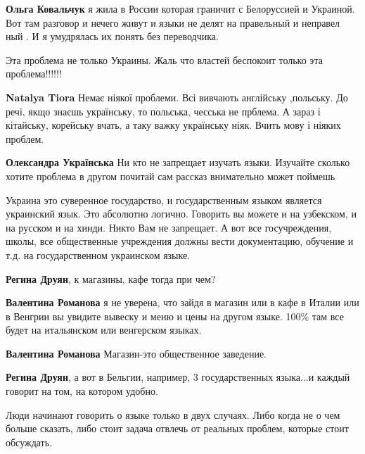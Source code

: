 \begin{itemize}
{\begin{itemize}

\textbf{Ольга Ковальчук} я жила в России которая граничит с Белоруссией и Украиной. Вот
там разговор и нечего живут и языки не делят на правельный и неправел ный . И я
умудрялась их понять без переводчика.

\end{itemize}


Эта проблема не только Украины. Жаль что властей беспокоит только эта проблема!!!!!!

\begin{itemize}
\textbf{Natalya Tiora} Немає ніякої проблеми. Всі вивчають англійську
,польську. До речі, якщо знаєшь українську, то польська, чесська не прблема. А
зараз і кітайську, корейську вчать, а таку важку українську ніяк. Вчить мову і
ніяких проблем.

\textbf{Олександра Українська} 
Ни кто не запрещает изучать языки. Изучайте сколько хотите
проблема в другом почитай сам рассказ внимательно может поймешь
\end{itemize}


Украина это суверенное государство, и государственным языком является
украинский язык. Это абсолютно логично. Говорить вы можете и на узбекском, и на
русском и на хинди. Никто Вам не запрещает. А вот все госучреждения, школы, все
общественные учреждения должны вести документацию, обучение и т.д. на
государственном украинском языке.

\begin{itemize}
\textbf{Регина Друян}, к магазины, кафе тогда при чем?


\textbf{Валентина Романова} я не уверена, что зайдя в магазин или в кафе в
Италии или в Венгрии вы увидите вывеску и меню и цены на другом языке. 100\% там
все будет на итальянском или венгерском языках.

\textbf{Валентина Романова} Магазин-это общественное заведение.

\textbf{Регина Друян}, а вот в Бельгии, например, 3 государственных языка...и каждый говорит на том, на котором удобно.
\end{itemize}


Люди начинают говорить о языке только в двух случаях. Либо когда не о чем
больше сказать, либо стоит задача отвлечь от реальных проблем, которые стоит
обсуждать.

}
\end{itemize}
